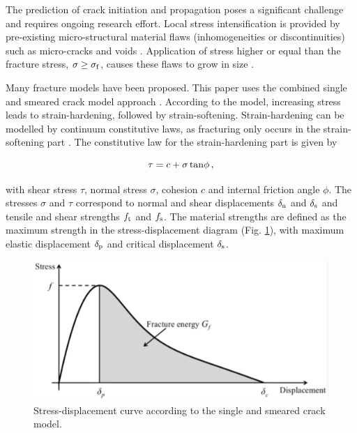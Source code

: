 \documentclass[12pt,twoside]{article}
\theoremstyle{break}
\begin{document}
\bigbreak
The prediction of crack initiation and propagation poses a significant challenge and requires ongoing research effort. Local stress intensification is provided by pre-existing micro-structural material flaws (inhomogeneities or discontinuities) such as micro-cracks and voids \cite{Sch12}. Application of stress higher or equal than the fracture stress, $\sigma\geq\sigma_{\rm{f}}$, causes these flaws to grow in size \cite{Flo98, Pel16}.

\bigbreak
Many fracture models have been proposed. This paper uses the combined single and smeared crack model approach \cite{Mun99, Lat15}. According to the model, increasing stress leads to strain-hardening, followed by strain-softening. Strain-hardening can be modelled by continuum constitutive laws, as fracturing only occurs in the strain-softening part \cite{Mun13}. The constitutive law for the strain-hardening part is given by

\begin{equation}
    \tau=c+\sigma\,{\rm{tan}}\phi\,,
\end{equation}

with shear stress $\tau$, normal stress $\sigma$, cohesion $c$ and internal friction angle $\phi$. The stresses $\sigma$ and $\tau$ correspond to normal and shear displacements $\delta_{\rm{n}}$ and $\delta_{\rm{s}}$ and tensile and shear strengths $f_{\rm{t}}$ and $f_{\rm{s}}$. The material strengths are defined as the maximum strength in the stress-displacement diagram (Fig. \ref{fig:FractureEnergy}), with maximum elastic displacement $\delta_{\rm{p}}$ and critical displacement $\delta_{\rm{s}}$.

\begin{figure}[!htbp]
    \centering
    \includegraphics[width=\textwidth*2/3]{FractureEnergy}
    \caption{Stress-displacement curve according to the single and smeared crack model. \cite{Lat15}}
    \label{fig:FractureEnergy}
\end{figure}
\end{document}
